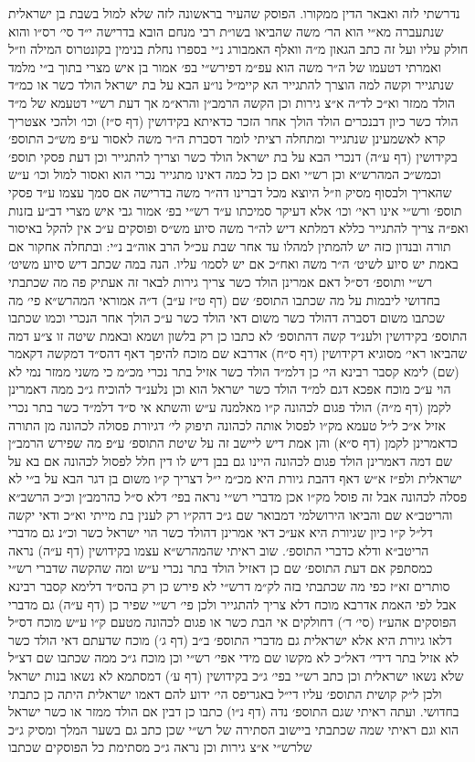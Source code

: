 \documentclass[12pt, openany]{book}
\begin{document}
\begin{multicols}{2}
נדרשתי לזה ואבאר הדין ממקורו. הפוסק שהעיר בראשונה לזה שלא למול בשבת בן ישראלית שנתעברה מא״י הוא הר׳ משה שהביאו בשו״ת רבי מנחם הובא בדרישה י״ד סי׳ רס״ו והוא חולק עליו ועל זה כתב הגאון מ״ה וואלף האמבורג נ״י בספרו נחלת בנימין בקונטרוס המילה וז״ל ואמרתי דטעמו של ה״ר משה הוא עפ״מ דפירש״י בפ׳ אמור בן איש מצרי בתוך ב״י מלמד שנתגייר וקשה למה הוצרך להתגייר הא קיימ״ל נו״ע הבא על בת ישראל הולד כשר או כמ״ד הולד ממזר וא״כ לד״ה א״צ גירות וכן הקשה הרמב״ן והרא״מ אך דעת רש״י דטעמא של מ״ד הולד כשר כיון דבנכרים הולד הולך אחר הזכר כדאיתא בקידושין (דף ס״ז) וכו׳ ולהכי אצטריך קרא לאשמעינן שנתגייר ומתחלה רציתי לומר דסברת ה״ר משה לאסור ע״פ מש״כ התוספ׳ בקידושין (דף ע״ה) דנכרי הבא על בת ישראל הולד כשר וצריך להתגייר וכן דעת פסקי תוספ׳ וכמש״כ המהרש״א וכן רש״י ואם כן כל כמה דאינו מתגייר נכרי הוא ואסור למול וכו׳ ע״ש שהאריך ולבסוף מסיק וז״ל היוצא מכל דברינו דה״ר משה בדרישה אם סמך עצמו ע״ד פסקי תוספ׳ ורש״י אינו ראי׳ וכו׳ אלא דעיקר סמיכתו ע״ד רש״י בפ׳ אמור גבי איש מצרי דב״ע בזנות ואפ״ה צריך להתגייר כללא דמלתא דיש לה״ר משה סיוע מש״ס ופוסקים ע״כ אין להקל באיסור תורה ובנדון כזה יש להמתין למהלו עד אחר שבת עכ״ל הרב אוה״ב נ״י: ובתחלה אחקור אם באמת יש סיוע לשיט׳ ה״ר משה ואח״כ אם יש לסמו׳ עליו. הנה במה שכתב דיש סיוע משיט׳ רש״י ותוספ׳ דס״ל דאם אמרינן הולד כשר צריך גירות לבאר זה אעתיק פה מה שכתבתי בחדושי ליבמות על מה שכתבו התוספ׳ שם (דף ט״ז ע״ב) ד״ה אמוראי המהרש״א פי׳ מה שכתבו משום דסברה דהולד כשר משום דאי הולד כשר ע״כ הולך אחר הנכרי וכמו שכתבו התוספ׳ בקידושין ולענ״ד קשה דהתוספ׳ לא כתבו כן רק בלשון ושמא ובאמת שיטה זו צ״ע דמה שהביאו ראי׳ מסוגיא דקידושין (דף ס״ח) אדרבא שם מוכח להיפך דאף דהס״ד דמקשה דקאמר (שם) לימא קסבר רבינא הי׳ כן דלמ״ד הולד כשר אזיל בתר נכרי מכ״מ כי משני ממזר נמי לא הוי ע״כ מוכח אפכא דגם למ״ד הולד כשר ישראל הוא וכן נלענ״ד להוכיח ג״כ ממה דאמרינן לקמן (דף מ״ה) הולד פגום לכהונה ק״ו מאלמנה ע״ש והשתא אי ס״ד דלמ״ד כשר בתר נכרי אזיל א״כ ל״ל טעמא מק״ו לפסול אותה לכהונה תיפוק לי׳ דגיורת פסולה לכהונה מן התורה כדאמרינן לקמן (דף ס״א) והן אמת דיש ליישב זה על שיטת התוספ׳ ע״פ מה שפירש הרמב״ן שם דמה דאמרינן הולד פגום לכהונה היינו גם בבן דיש לו דין חלל לפסול לכהונה אם בא על ישראלית ולפ״ז א״ש דאף דהבת גיורת היא מכ״מ י״ל דצריך ק״ו משום בן דגר הבא על ב״י לא פסלה לכהונה אבל זה פוסל מק״ו אכן מדברי רש״י נראה בפי׳ דלא ס״ל כהרמב״ן וכ״כ הרשב״א והריטב״א שם והביאו הירושלמי דמבואר שם ג״כ דהק״ו רק לענין בת מייתי וא״כ ודאי יקשה דל״ל ק״ו כיון שגיורת היא אע״כ דאי אמרינן דהולד כשר הוי ישראל כשר וכ״נ גם מדברי הריטב״א ודלא כדברי התוספ׳. שוב ראיתי שהמהרש״א עצמו בקידושין (דף ע״ה) נראה כמסתפק אם דעת התוספ׳ שם כן דאזיל הולד בתר נכרי ע״ש ומה שהקשה שדברי רש״י סותרים זא״ז כפי מה שכתבתי בזה לק״מ דרש״י לא פירש כן רק בהס״ד דלימא קסבר רבינא אבל לפי האמת אדרבא מוכח דלא צריך להתגייר ולכן פי׳ רש״י שפיר כן (דף ע״ה) גם מדברי הפוסקים אהע״ז (סי׳ ד׳) דחולקים אי הבת כשר או פגום לכהונה מטעם ק״ו ע״ש מוכח דס״ל דלאו גיורת היא אלא ישראלית גם מדברי התוספ׳ ב״ב (דף ג׳) מוכח שדעתם דאי הולד כשר לא אזיל בתר דידי׳ דאל״כ לא מקשו שם מידי אפי׳ רש״י וכן מוכח ג״כ ממה שכתבו שם דצ״ל שלא נשאו ישראלית וכן כתב רש״י בפי׳ ג״כ בקידושין (דף ע׳) דמסתמא לא נשאו בנות ישראל ולכן ל״ק קושית התוספ׳ עליו די״ל באגריפס הי׳ ידוע להם דאמו ישראלית היתה כן כתבתי בחדושי. ועתה ראיתי שגם התוספ׳ נדה (דף נ״ו) כתבו כן דבין אם הולד ממזר או כשר ישראל הוא וגם ראיתי שמה שכתבתי ביישוב הסתירה של רש״י שכן כתב גם בשער המלך ומסיק ג״כ שלרש״י א״צ גירות וכן נראה ג״כ מסתימת כל הפוסקים שכתבו 
\end{multicols}
\end{document}
